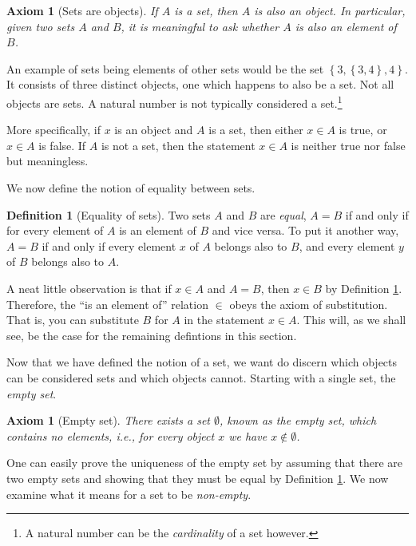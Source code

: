 \documentclass[a4paper, twocolumn]{report}
\newcounter{dummy} \numberwithin{dummy}{section}
\newcounter{axmcntr} \numberwithin{axmcntr}{chapter}
\newtheorem{axm}[axmcntr]{Axiom}
\theoremstyle{definition}
\newtheorem{defn}[dummy]{Definition}
\theoremstyle{solution}
\begin{document}
\begin{axm}[Sets are objects]
  \label{axm_31}   
  If $A$ is a set, then $A$ is also an object. In particular, given two sets
  $A$ and $B$, it is meaningful to ask whether $A$ is also an element of $B$.
\end{axm}

An example of sets being elements of other sets would be the set $\left\{ 3,
\left\{ 3, 4 \right\}, 4 \right\}$.  It consists of three distinct objects, one
which happens to also be a set. Not all objects are sets. A natural number is
not typically considered a set.\footnote{A natural number can be the
\textit{cardinality} of a set however.}

More specifically, if $x$ is an object and $A$ is a set, then either $x \in A$
is true, or $x \in A$ is false. If $A$ is not a set, then the statement $x \in
A$ is neither true nor false but meaningless.

\addtocounter{dummy}{2}

We now define the notion of equality between sets.
\begin{defn}[Equality of sets]
  \label{defn_314}
  Two sets $A$ and $B$ are \textit{equal}, $A = B$ if and only if for every
  element of $A$ is an element of $B$ and vice versa. To put it another way, $A
  = B$ if and only if every element $x$ of $A$ belongs also to $B$, and every
  element $y$ of $B$ belongs also to $A$.
\end{defn}

\addtocounter{dummy}{1}

A neat little observation is that if $x \in A$ and $A = B$, then $x \in B$ by
Definition \ref{defn_314}. Therefore, the ``is an element of'' relation $\in$
obeys the axiom of substitution. That is, you can substitute $B$ for $A$ in the
statement $x \in A$. This will, as we shall see, be the case for the remaining
defintions in this section.

Now that we have defined the notion of a set, we want do discern which objects
can be considered sets and which objects cannot. Starting with a single set, the \textit{empty set}.

\begin{axm}[Empty set]
  \label{axm_32}
  There exists a set $\emptyset$, known as the empty set, which contains no
  elements, i.e., for every object $x$ we have $x \notin \emptyset$. 
\end{axm}

One can easily prove the uniqueness of the empty set by assuming that there are
two empty sets and showing that they must be equal by Definition
\ref{defn_314}. We now examine what it means for a set to be
\textit{non-empty}.
\end{document}
